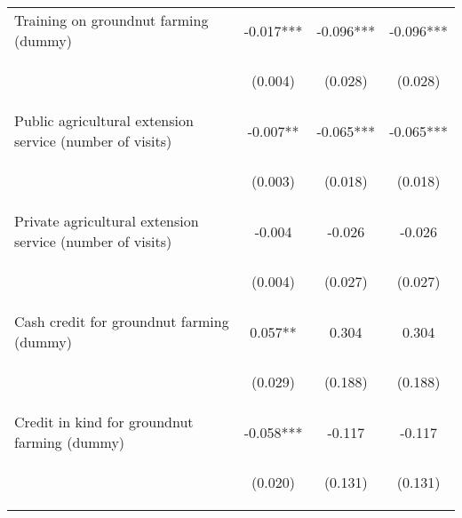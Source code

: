 \begin{center}
\begin{tabular}{lccc}
Training on groundnut farming (dummy) & -0.017*** & -0.096*** & -0.096*** \\
\vspace{4pt} & \begin{footnotesize}(0.004)\end{footnotesize} & \begin{footnotesize}(0.028)\end{footnotesize} & \begin{footnotesize}(0.028)\end{footnotesize} \\
Public agricultural extension service (number of visits) & -0.007** & -0.065*** & -0.065*** \\
\vspace{4pt} & \begin{footnotesize}(0.003)\end{footnotesize} & \begin{footnotesize}(0.018)\end{footnotesize} & \begin{footnotesize}(0.018)\end{footnotesize} \\
Private agricultural extension service (number of visits) & -0.004 & -0.026 & -0.026 \\
\vspace{4pt} & \begin{footnotesize}(0.004)\end{footnotesize} & \begin{footnotesize}(0.027)\end{footnotesize} & \begin{footnotesize}(0.027)\end{footnotesize} \\
Cash credit for groundnut farming (dummy) & 0.057** & 0.304 & 0.304 \\
\vspace{4pt} & \begin{footnotesize}(0.029)\end{footnotesize} & \begin{footnotesize}(0.188)\end{footnotesize} & \begin{footnotesize}(0.188)\end{footnotesize} \\
Credit in kind for groundnut farming (dummy) & -0.058*** & -0.117 & -0.117 \\
\vspace{4pt} & \begin{footnotesize}(0.020)\end{footnotesize} & \begin{footnotesize}(0.131)\end{footnotesize} & \begin{footnotesize}(0.131)\end{footnotesize} \\

\end{tabular}
\end{center}

